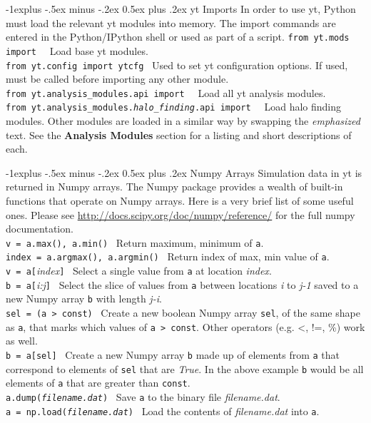 \documentclass[10pt,landscape]{article}
\makeatletter
\renewcommand{\subsection}{\@startsection{subsection}{2}{0mm}%
                                {-1explus -.5ex minus -.2ex}%
                                {0.5ex plus .2ex}%
                                {\normalfont\normalsize\bfseries}}
\makeatother
\begin{document}
\begin{multicols}{3}
\subsection{yt Imports}
In order to use yt, Python must load the relevant yt modules into memory.
The import commands are entered in the Python/IPython shell or
used as part of a script.
\newlength{\MyLen}
\texttt{from yt.mods import \textasteriskcentered}  \textemdash\ 
Load base yt  modules. \\
\texttt{from yt.config import ytcfg}  \textemdash\ 
Used to set yt configuration options.
 If used, must be called before importing any other module.\\
\texttt{from yt.analysis\_modules.api import \textasteriskcentered}   \textemdash\ 
Load all yt analysis modules. \\
\texttt{from yt.analysis\_modules.\emph{halo\_finding}.api import \textasteriskcentered}  \textemdash\ 
Load halo finding modules. Other modules
are loaded in a similar way by swapping the 
{\em emphasized} text.
See the \textbf{Analysis Modules} section for a listing and short descriptions of each.

\subsection{Numpy Arrays}
Simulation data in yt is returned in Numpy arrays. The Numpy package provides a wealth of built-in
functions that operate on Numpy arrays. Here is a very brief list of some useful ones.
Please see \url{http://docs.scipy.org/doc/numpy/reference/} for the full
numpy documentation.\\
\settowidth{\MyLen}{\texttt{multicol} }
\texttt{v = a.max(), a.min()} \textemdash\ Return maximum, minimum of \texttt{a}. \\
\texttt{index = a.argmax(), a.argmin()} \textemdash\ Return index of max, 
min value of \texttt{a}.\\
\texttt{v = a[}{\it index}\texttt{]} \textemdash\ Select a single value from \texttt{a} at location {\it index}.\\
\texttt{b = a[}{\it i:j}\texttt{]} \textemdash\ Select the slice of values from \texttt{a} between
locations {\it i} to {\it j-1} saved to a new Numpy array \texttt{b} with length {\it j-i}. \\
\texttt{sel = (a > const)}  \textemdash\ Create a new boolean Numpy array \texttt{sel}, of the same shape as \texttt{a},
that marks which values of \texttt{a > const}. Other operators (e.g. \textless, !=, \%) work as well.\\
\texttt{b = a[sel]} \textemdash\ Create a new Numpy array \texttt{b} made up of elements from \texttt{a} that correspond to elements of \texttt{sel}
that are {\it True}. In the above example \texttt{b} would be all elements of \texttt{a} that are greater than \texttt{const}.\\
\texttt{a.dump({\it filename.dat})} \textemdash\ Save \texttt{a} to the binary file {\it filename.dat}.\\
\texttt{a = np.load({\it filename.dat})} \textemdash\ Load the contents of {\it filename.dat} into \texttt{a}.


\end{multicols}
\end{document}
